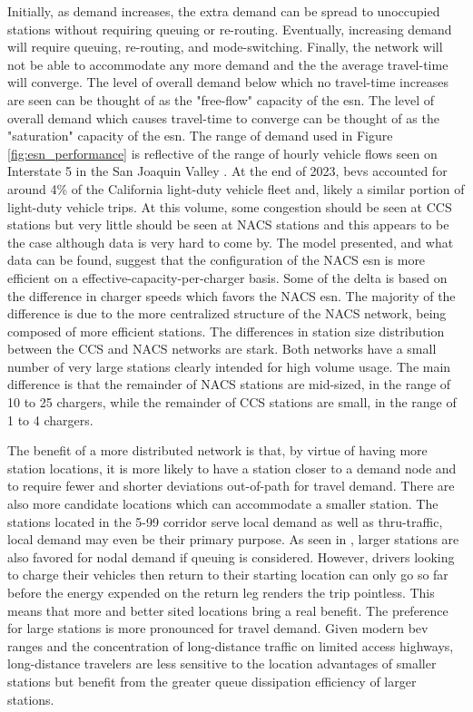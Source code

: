 Initially, as demand increases, the extra demand can be spread to unoccupied stations without requiring queuing or re-routing. Eventually, increasing demand will require queuing, re-routing, and mode-switching. Finally, the network will not be able to accommodate any more demand and the the average travel-time will converge. The level of overall demand below which no travel-time increases are seen can be thought of as the "free-flow" capacity of the \gls{esn}. The level of overall demand which causes travel-time to converge can be thought of as the "saturation" capacity of the \gls{esn}. The range of demand used in Figure \ref{fig:esn_performance} is reflective of the range of hourly vehicle flows seen on Interstate 5 in the San Joaquin Valley \cite{caltrans_2017, caltrans_2023}. At the end of 2023, \glspl{bev} accounted for around 4\% of the California light-duty vehicle fleet \citep{cec_2024} and, likely a similar portion of light-duty vehicle trips. At this volume, some congestion should be seen at CCS stations but very little should be seen at NACS stations and this appears to be the case \citep{ucd_2024} although data is very hard to come by. The model presented, and what data can be found, suggest that the configuration of the NACS \gls{esn} is more efficient on a effective-capacity-per-charger basis. Some of the delta is based on the difference in charger speeds which favors the NACS \gls{esn}. The majority of the difference is due to the more centralized structure of the NACS network, being composed of more efficient stations. The differences in station size distribution between the CCS and NACS networks are stark. Both networks have a small number of very large stations clearly intended for high volume usage. The main difference is that the remainder of NACS stations are mid-sized, in the range of 10 to 25 chargers, while the remainder of CCS stations are small, in the range of 1 to 4 chargers.

The benefit of a more distributed network is that, by virtue of having more station locations, it is more likely to have a station closer to a demand node and to require fewer and shorter deviations out-of-path for travel demand. There are also more candidate locations which can accommodate a smaller station. The stations located in the 5-99 corridor serve local demand as well as thru-traffic, local demand may even be their primary purpose. As seen in \citep{Liu_2023}, larger stations are also favored for nodal demand if queuing is considered. However, drivers looking to charge their vehicles then return to their starting location can only go so far before the energy expended on the return leg renders the trip pointless. This means that more and better sited locations bring a real benefit. The preference for large stations is more pronounced for travel demand. Given modern \gls{bev} ranges and the concentration of long-distance traffic on limited access highways, long-distance travelers are less sensitive to the location advantages of smaller stations but benefit from the greater queue dissipation efficiency of larger stations.


